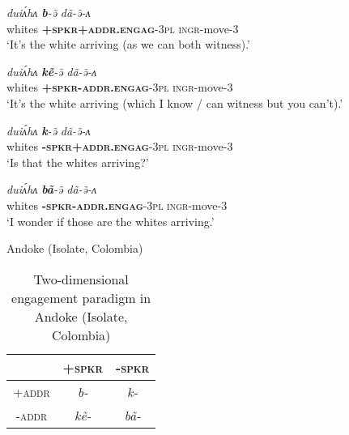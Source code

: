 \begin{exe}
\ex\label{ex:EngagementIntro}
\begin{xlist}
\ex 
\gll \textit{duiʌ́hʌ} \textit{\textbf{b}-ə̃} \textit{dã-ə̃-ʌ} \\
whites \textsc{\textbf{+spkr+addr.engag}-3pl} \textsc{ingr}-move-3 \\
\glt `It's the white arriving (as we can both witness).'

\ex 
\gll \textit{duiʌ́hʌ} \textit{\textbf{kẽ}-ə̃} \textit{dã-ə̃-ʌ} \\
whites \textsc{\textbf{+spkr-addr.engag}-3pl} \textsc{ingr}-move-3 \\
\glt `It's the white arriving (which I know / can witness but you can't).'

\ex
\gll \textit{duiʌ́hʌ} \textit{\textbf{k}-ə̃} \textit{dã-ə̃-ʌ} \\
whites \textsc{\textbf{-spkr+addr.engag}-3pl} \textsc{ingr}-move-3 \\
\glt `Is that the whites arriving?'

\ex
\gll \textit{duiʌ́hʌ} \textit{\textbf{bã}-ə̃} \textit{dã-ə̃-ʌ} \\
whites \textsc{\textbf{-spkr-addr.engag}-3pl} \textsc{ingr}-move-3 \\
\glt `I wonder if those are the whites arriving.'

\end{xlist}
Andoke (Isolate, Colombia) \cite[115-116]{EvansBergqvistSanRoque2018a}
\end{exe}

\begin{table}[t]
\centering

\caption{Two-dimensional engagement paradigm in Andoke (Isolate, Colombia) \cite[115-116]{EvansBergqvistSanRoque2018a}}
    \begin{tabular}{c|c|c}
         & \textsc{+spkr} & \textsc{-spkr} \\
         \hline
        \textsc{+addr} & \textit{b-} & \textit{k-} \\
        \hline
        \textsc{-addr} & \textit{kẽ-} & \textit{bã-} \\
    \end{tabular}

\label{tab:EngagementAndoke}
\end{table}

